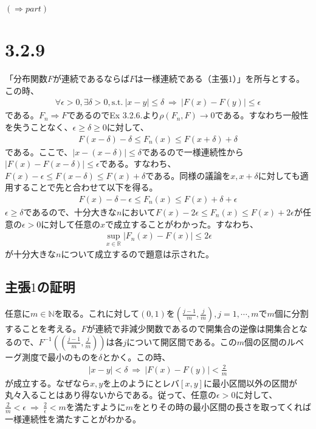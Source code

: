 \documentclass{article}
\begin{document}
\noindent $(\Rightarrow part)$



\section{3.2.9}
「分布関数$F$が連続であるならば$F$は一様連続である（主張$1$）」を所与とする。この時、
\begin{align*}
	\forall \epsilon > 0, \exists \delta > 0, \text{s.t.}\ |x-y| \leq \delta\ \Rightarrow\ \left| F(x) - F(y) \right| \leq \epsilon
\end{align*}
である。$F_n \Rightarrow F$であるのでEx 3.2.6.より$\rho\left( F_n, F \right) \to 0$である。すなわち一般性を失うことなく、$\epsilon \geq \delta \geq 0$に対して、
\begin{align*}
	F\left( x-\delta \right) -\delta \leq F_n(x) \leq F(x + \delta) + \delta
\end{align*}
である。ここで、$|x - (x-\delta)| \leq \delta$であるので一様連続性から$\left| F(x) - F(x-\delta) \right| \leq \epsilon$である。すなわち、$F(x) - \epsilon \leq F(x - \delta) \leq F(x) + \delta$である。同様の議論を$x, x+\delta$に対しても適用することで先と合わせて以下を得る。
\begin{align*}
	F(x) - \delta - \epsilon \leq F_n(x) \leq F(x) + \delta + \epsilon
\end{align*}
$\epsilon \geq \delta$であるので、十分大きな$n$において$F(x) - 2\epsilon \leq F_n(x) \leq F(x)+ 2\epsilon$が任意の$\epsilon > 0$に対して任意の$x$で成立することがわかった。すなわち、
\begin{align*}
	\sup_{x\in \mathbb{R}} \left| F_n(x) - F(x) \right| \leq 2\epsilon
\end{align*}
が十分大きな$n$について成立するので題意は示された。

\subsection{主張$1$の証明}
任意に$m \in \mathbb{N}$を取る。これに対して$(0,1)$を$\left( \frac{j-1}{m}, \frac{j}{m} \right), j = 1,\cdots, m$で$m$個に分割することを考える。$F$が連続で非減少関数であるので開集合の逆像は開集合となるので、$F^{-1}\left( \left( \frac{j-1}{m}, \frac{j}{m} \right) \right)$は各$j$について開区間である。この$m$個の区間のルベーグ測度で最小のものを$\delta$とかく。この時、
\begin{align*}
	|x-y| < \delta\ \Rightarrow\ \left| F(x) - F(y) \right| < \frac{2}{m}
\end{align*}
が成立する。なぜなら$x,y$を上のようにとレバ$[x, y]$に最小区間以外の区間が丸々入ることはあり得ないからである。従って、任意の$\epsilon > 0$に対して、$\frac{2}{m} < \epsilon\ \Rightarrow\ \frac{2}{\epsilon} < m$を満たすように$m$をとりその時の最小区間の長さを取ってくれば一様連続性を満たすことがわかる。
\end{document}
